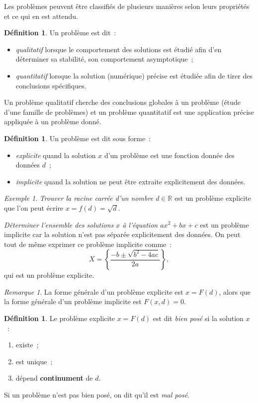 \documentclass{article}
\theoremstyle{definition}
\newtheorem{déf}[thm]{Définition}
\theoremstyle{remark}
\newtheorem*{rmq}{Remarque}
\newtheorem{ex}{Exemple}
\newcommand{\R}{\mathbb R}
\begin{document}
	Les problèmes peuvent être classifiés de plusieurs manières selon leurs propriétés et ce qui en est attendu.

	\begin{déf} Un problème est dit~:
	\begin{itemize}
		\item \emph{qualitatif} lorsque le comportement des solutions est étudié afin d'en déterminer sa stabilité, son comportement asymptotique~;
		\item \emph{quantitatif} lorsque la solution (numérique) précise est étudiée afin de tirer des conclusions spécifiques.
	\end{itemize}
	\end{déf}

	Un problème qualitatif cherche des conclusions globales à un problème (étude d'une famille de problèmes) et un problème quantitatif est une application
	précise appliquée à un problème donné.

	\begin{déf} Un problème est dit sous forme~:
	\begin{itemize}
		\item \emph{explicite} quand la solution $x$ d'un problème est une fonction donnée des données $d$~;
		\item \emph{implicite} quand la solution ne peut être extraite explicitement des données.
	\end{itemize}
	\end{déf}

	\begin{ex} \emph{Trouver la racine carrée d'un nombre $d \in \R$} est un problème explicite que l'on peut écrire $x = f(d) = \sqrt d$.

	\emph{Déterminer l'ensemble des solutions $x$ à l'équation $ax^2 + bx + c$} est un problème implicite car la solution n'est pas séparée explicitement des
	données. On peut tout de même exprimer ce problème implicite comme~:
	\[X = \left\{\frac {-b \pm \sqrt {b^2-4ac}}{2a}\right\},\]
	qui est un problème explicite.
	\end{ex}

	\begin{rmq} La forme générale d'un problème explicite est $x = F(d)$, alors que la forme générale d'un problème implicite est $F(x, d) = 0$. \end{rmq}

	\begin{déf} Le problème explicite $x = F(d)$ est dit \emph{bien posé} si la solution $x$~:
	\begin{enumerate}
		\item existe~;
		\item est unique~;
		\item dépend \textbf{continument} de $d$.
	\end{enumerate}

	Si un problème n'est pas bien posé, on dit qu'il est \emph{mal posé}.
	\end{déf}
\end{document}
